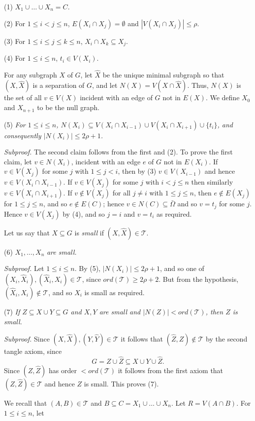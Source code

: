 \hspace*{12pt}(1) $X_1 \cup \dots \cup X_n = C$.

\hspace*{12pt}(2) For $1 \le i < j \le n$, $E(X_i \cap X_j) = \emptyset$ and $|V(X_i \cap X_j)| \le \rho$.

\hspace*{12pt}(3) For $1 \le i \le j \le k \le n$, $X_i \cap X_k \subseteq X_j$.

\hspace*{12pt}(4) For $1 \le i \le n$, $t_i \in V(X_i)$.

For any subgraph $X$ of $G$, let $\hat{X}$ be the unique minimal subgraph so that $(X, \hat{X})$ is a separation of $G$, and let $N(X) = V(X \cap \hat{X})$. Thus, $N(X)$ is the set of all $v \in V(X)$ incident with an edge of $G$ not in $E(X)$. We define $X_0$ and $X_{n+1}$ to be the null graph.

\hspace*{12pt}(5) \textit{For $1 \le i \le n$, $N(X_i) \subseteq V(X_i \cap X_{i-1}) \cup V(X_i \cap X_{i+1}) \cup \{t_i\}$, and consequently $|N(X_i)| \le 2\rho+1$.}

\textit{Subproof.} The second claim follows from the first and (2). To prove the first claim, let $v \in N(X_i)$, incident with an edge $e$ of $G$ not in $E(X_i)$. If $v \in V(X_j)$ for some $j$ with $1 \le j < i$, then by (3) $v \in V(X_{i-1})$ and hence $v \in V(X_i \cap X_{i-1})$. If $v \in V(X_j)$ for some $j$ with $i < j \le n$ then similarly $v \in V(X_i \cap X_{i+1})$. If $v \notin V(X_j)$ for all $j \ne i$ with $1 \le j \le n$, then $e \notin E(X_j)$ for $1 \le j \le n$, and so $e \notin E(C)$; hence $v \in N(C) \subseteq \bar{\Omega}$ and so $v = t_j$ for some $j$. Hence $v \in V(X_j)$ by (4), and so $j = i$ and $v = t_i$ as required.

Let us say that $X \subseteq G$ is \textit{small} if $(X, \hat{X}) \in \mathscr{T}$.

\hspace*{12pt}(6) $X_1, \dots, X_n$ \textit{are small.}

\textit{Subproof.} Let $1 \le i \le n$. By (5), $|N(X_i)| \le 2\rho+1$, and so one of $(X_i, \hat{X}_i), (\hat{X}_i, X_i) \in \mathscr{T}$, since $ord(\mathscr{T}) \ge 2\rho+2$. But from the hypothesis, $(\hat{X}_i, X_i) \notin \mathscr{T}$, and so $X_i$ is small as required.

\hspace*{12pt}(7) \textit{If $Z \subseteq X \cup Y \subseteq G$ and $X, Y$ are small and $|N(Z)| < ord(\mathscr{T})$, then $Z$ is small.}

\textit{Subproof.} Since $(X, \hat{X}), (Y, \hat{Y}) \in \mathscr{T}$ it follows that $(\hat{Z}, Z) \notin \mathscr{T}$ by the second tangle axiom, since
\begin{equation*}
G = Z \cup \hat{Z} \subseteq X \cup Y \cup \hat{Z}.
\end{equation*}
Since $(Z, \hat{Z})$ has order $< ord(\mathscr{T})$ it follows from the first axiom that $(Z, \hat{Z}) \in \mathscr{T}$ and hence $Z$ is small. This proves (7).

We recall that $(A, B) \in \mathscr{T}$ and $B \subseteq C = X_1 \cup \dots \cup X_n$. Let $R = V(A \cap B)$. For $1 \le i \le n$, let
